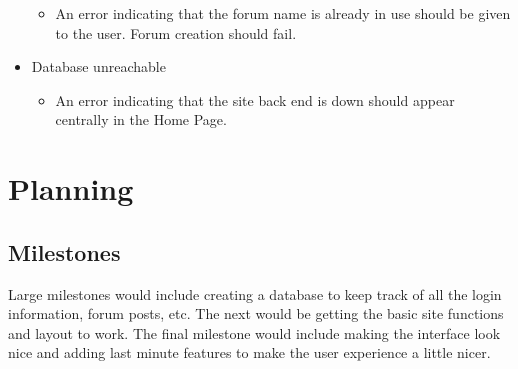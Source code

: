 \documentclass[12pt]{article}
\begin{document}
\begin{itemize}
            \begin{itemize}
                \item An error indicating that the forum name is already in use should be given to the user. Forum creation should fail.
            \end{itemize}
        \item Database unreachable
            \begin{itemize}
                \item An error indicating that the site back end is down should appear centrally in the Home Page. 
            \end{itemize}
    \end{itemize}


\section{Planning}
\subsection{Milestones}
\begin{flushleft}
Large milestones would include creating a database to keep track of all the login information, forum posts, etc. The next would be getting the basic site functions and layout to work. The final milestone would include making the interface look nice and adding last minute features to make the user experience a little nicer.
\end{flushleft}
\end{document}
